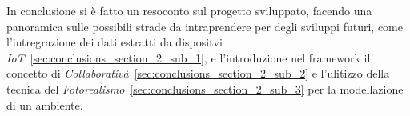 In conclusione si è fatto un resoconto sul progetto sviluppato, facendo una panoramica sulle possibili strade
da intraprendere per degli sviluppi futuri, come l'intregrazione dei dati estratti da dispositvi
\emph{IoT}~\ref{sec:conclusions_section_2_sub_1},
e l'introduzione nel framework il concetto di \emph{Collaborativà}~\ref{sec:conclusions_section_2_sub_2}
e l'ulitizzo della tecnica del \emph{Fotorealismo}~\ref{sec:conclusions_section_2_sub_3} per la modellazione di un ambiente.
